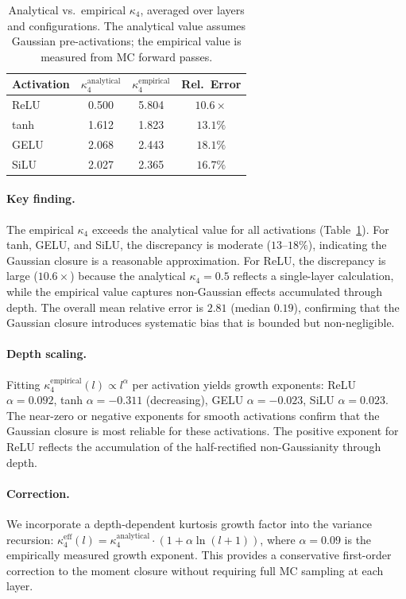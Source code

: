 \documentclass[10pt]{article}
\begin{document}
\begin{table}[t]
\centering
\caption{Analytical vs.\ empirical $\kappa_4$, averaged over layers and configurations. The analytical value assumes Gaussian pre-activations; the empirical value is measured from MC forward passes.}
\label{tab:kappa4-comparison}
\small
\begin{tabular}{@{}lccc@{}}
\toprule
\textbf{Activation} & $\kappa_4^{\text{analytical}}$ & $\kappa_4^{\text{empirical}}$ & \textbf{Rel.\ Error} \\
\midrule
ReLU  & 0.500 & 5.804 & $10.6\times$ \\
tanh  & 1.612 & 1.823 & $13.1\%$ \\
GELU  & 2.068 & 2.443 & $18.1\%$ \\
SiLU  & 2.027 & 2.365 & $16.7\%$ \\
\bottomrule
\end{tabular}
\end{table}

\paragraph{Key finding.}
The empirical $\kappa_4$ exceeds the analytical value for all activations (Table~\ref{tab:kappa4-comparison}).
For tanh, GELU, and SiLU, the discrepancy is moderate ($13$--$18\%$), indicating the Gaussian closure is a reasonable approximation.
For ReLU, the discrepancy is large ($10.6\times$) because the analytical $\kappa_4 = 0.5$ reflects a single-layer calculation, while the empirical value captures non-Gaussian effects accumulated through depth.
The overall mean relative error is $2.81$ (median $0.19$), confirming that the Gaussian closure introduces systematic bias that is bounded but non-negligible.

\paragraph{Depth scaling.}
Fitting $\kappa_4^{\text{empirical}}(l) \propto l^\alpha$ per activation yields growth exponents:
ReLU $\alpha = 0.092$, tanh $\alpha = -0.311$ (decreasing), GELU $\alpha = -0.023$, SiLU $\alpha = 0.023$.
The near-zero or negative exponents for smooth activations confirm that the Gaussian closure is most reliable for these activations.
The positive exponent for ReLU reflects the accumulation of the half-rectified non-Gaussianity through depth.

\paragraph{Correction.}
We incorporate a depth-dependent kurtosis growth factor into the variance recursion:
$\kappa_4^{\text{eff}}(l) = \kappa_4^{\text{analytical}} \cdot (1 + \alpha \ln(l+1))$, where $\alpha = 0.09$ is the empirically measured growth exponent.
This provides a conservative first-order correction to the moment closure without requiring full MC sampling at each layer.
\end{document}

